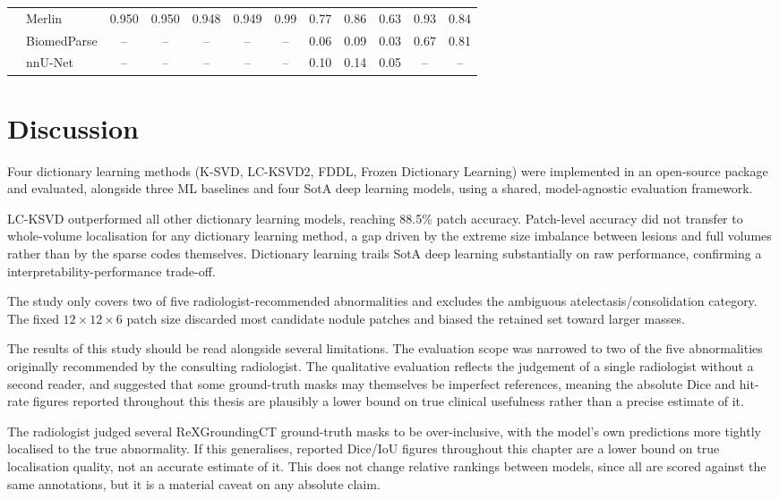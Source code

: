 \documentclass[conference]{IEEEtran}
\begin{document}
\begin{table}[t]
\begin{tabular}{llcccccccccc}
        & Merlin
        & 0.950 & 0.950 & 0.948 & 0.949 & 0.99
        & 0.77 & 0.86 & 0.63 & 0.93 & 0.84 \\

        & BiomedParse
        & -- & -- & -- & -- & --
        & 0.06 & 0.09 & 0.03 & 0.67 & 0.81 \\

        & nnU-Net
        & -- & -- & -- & -- & --
        & 0.10 & 0.14 & 0.05 & -- & -- \\

        \hline
    \end{tabular}
\end{table}

\section{Discussion}
Four dictionary learning methods (K-SVD, LC-KSVD2, FDDL, Frozen Dictionary Learning) were implemented in an
open-source package and evaluated, alongside three ML baselines and four SotA deep learning models, using a
shared, model-agnostic evaluation framework.

LC-KSVD outperformed all other dictionary learning models, reaching 88.5\% patch accuracy. Patch-level accuracy did not
transfer to whole-volume localisation for any dictionary learning method, a gap
driven by the extreme size imbalance between lesions and full volumes rather than by the sparse codes
themselves. Dictionary learning trails SotA deep learning substantially on raw performance, confirming a
interpretability-performance trade-off.

The study only covers two of five radiologist-recommended abnormalities and excludes the ambiguous
atelectasis/consolidation category. The fixed $12\times12\times6$ patch size discarded most candidate nodule
patches and biased the retained set toward larger masses.

The results of this study should be read alongside several limitations. The evaluation scope was narrowed to
two of the five abnormalities originally recommended by the consulting radiologist.
The qualitative evaluation reflects the judgement of a single radiologist without a second reader, and suggested
that some ground-truth masks may themselves be imperfect references, meaning the absolute Dice and hit-rate
figures reported throughout this thesis are plausibly a lower bound on true clinical usefulness rather than a precise
estimate of it.

The radiologist judged several ReXGroundingCT ground-truth masks to be over-inclusive, with the model's own
predictions more tightly localised to the true abnormality. If this
generalises, reported Dice/IoU figures throughout this chapter are a lower bound on true localisation quality,
not an accurate estimate of it. This does not change relative rankings between models, since all are scored
against the same annotations, but it is a material caveat on any absolute claim.
\end{document}
